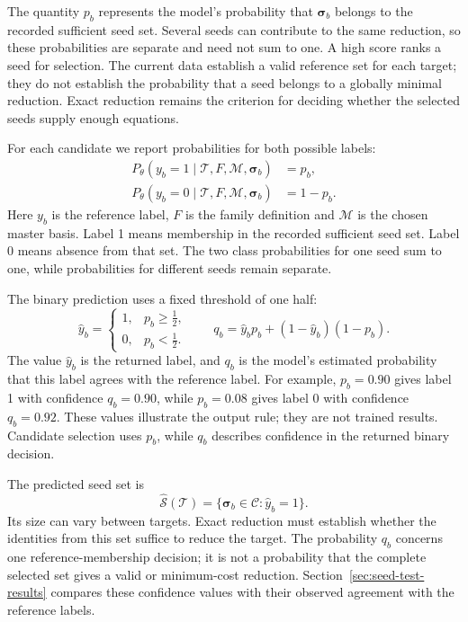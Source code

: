 The quantity $p_b$ represents the model's probability that
$\boldsymbol\sigma_b$ belongs to the recorded sufficient seed set.
Several seeds can contribute to the same reduction, so these
probabilities are separate and need not sum to one.
A high score ranks a seed for selection.
The current data establish a valid reference set for each target;
they do not establish the probability that a seed belongs to a
globally minimal reduction. Exact reduction remains the criterion
for deciding whether the selected seeds supply enough equations.

For each candidate we report probabilities for both possible labels:
\begin{equation}
 \begin{aligned}
 P_\theta(y_b=1\mid\mathcal T,F,\mathcal M,\boldsymbol\sigma_b)&=p_b,\\
 P_\theta(y_b=0\mid\mathcal T,F,\mathcal M,\boldsymbol\sigma_b)&=1-p_b.
 \end{aligned}
 \label{eq:seed-class-probabilities}
\end{equation}
Here $y_b$ is the reference label, $F$ is the family definition and
$\mathcal M$ is the chosen master basis. Label 1 means membership in the recorded sufficient seed set.
Label 0 means absence from that set. The two class probabilities for
one seed sum to one, while probabilities for different seeds remain
separate.

The binary prediction uses a fixed threshold of one half:
\begin{equation}
 \widehat y_b=
 \begin{cases}
  1,&p_b\geq\tfrac12,\\
  0,&p_b<\tfrac12.
 \end{cases}
 \qquad
 q_b=\widehat y_b p_b+(1-\widehat y_b)(1-p_b).
 \label{eq:seed-binary-confidence}
\end{equation}
The value $\widehat y_b$ is the returned label, and $q_b$ is the model's
estimated probability that this label agrees with the reference label.
For example, $p_b=0.90$ gives label 1 with confidence $q_b=0.90$,
while $p_b=0.08$ gives label 0 with confidence $q_b=0.92$.
These values illustrate the output rule; they are not trained results.
Candidate selection uses $p_b$, while $q_b$ describes confidence in
the returned binary decision.

The predicted seed set is
\begin{equation}
 \widehat{\mathcal S}(\mathcal T)
   =\{\boldsymbol\sigma_b\in\mathcal C:\widehat y_b=1\}.
 \label{eq:seed-predicted-set}
\end{equation}
Its size can vary between targets. Exact reduction must establish
whether the identities from this set suffice to reduce the target.
The probability $q_b$ concerns one reference-membership decision;
it is not a probability that the complete selected set gives a valid
or minimum-cost reduction. Section~\ref{sec:seed-test-results} compares these confidence values
with their observed agreement with the reference labels.

